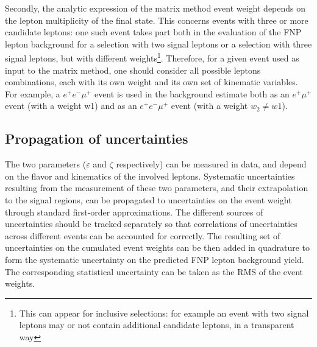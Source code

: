 Secondly, the analytic expression of the matrix method event weight depends on the lepton multiplicity of the final state. This concerns events with three or more candidate leptons: one such event takes part both in the evaluation of the FNP lepton background for a selection with two signal leptons or a selection with three signal leptons, but with different weights\footnote{This can appear for inclusive selections: for example an event with two signal leptons may or not contain additional candidate leptons, in a transparent way}. Therefore, for a given event used as input to the matrix method, one should consider all possible leptons combinations, each with its own weight and its own set of kinematic variables. For example, a $e^+e^-\mu^+$ event is used in the background estimate both as an $e^+\mu^+$ event (with a weight w1) and as an $e^+e^-\mu^+$ event (with a weight $w_2\neq w1$).  

\subsection{Propagation of uncertainties}

The two parameters ($\varepsilon$ and $\zeta$ respectively) can be measured in data, and depend on the flavor and kinematics of the involved leptons.  Systematic uncertainties resulting from the measurement of these two parameters, and their extrapolation to the signal regions, can be propagated to uncertainties on the event weight through standard first-order approximations. The different sources of uncertainties should be tracked separately so that correlations of uncertainties across different events can be accounted for correctly. The resulting set of uncertainties on the cumulated event weights can be then added in quadrature to form the systematic uncertainty on the predicted FNP lepton background yield. The corresponding statistical uncertainty can be taken as the RMS of the event weights.
